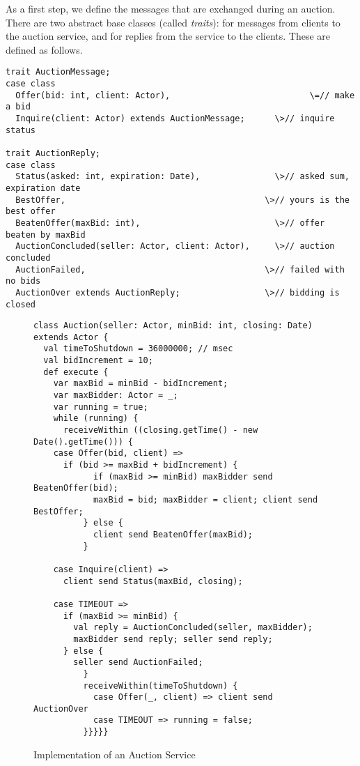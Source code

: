 \documentclass[11pt]{book}
\begin{document}
As a first step, we define the messages that are exchanged during an
auction. There are two abstract base classes (called {\em traits}):
\verb@AuctionMessage@ for messages from clients to the auction
service, and \verb@AuctionReply@ for replies from the service to the
clients.  These are defined as follows.
\begin{verbatim}
trait AuctionMessage;
case class 
  Offer(bid: int, client: Actor),                            \=// make a bid
  Inquire(client: Actor) extends AuctionMessage;      \>// inquire status

trait AuctionReply;
case class
  Status(asked: int, expiration: Date),               \>// asked sum, expiration date
  BestOffer,                                        \>// yours is the best offer
  BeatenOffer(maxBid: int),                           \>// offer beaten by maxBid
  AuctionConcluded(seller: Actor, client: Actor),     \>// auction concluded
  AuctionFailed,                                    \>// failed with no bids
  AuctionOver extends AuctionReply;                 \>// bidding is closed
\end{verbatim}

\begin{figure}[htb]
\begin{verbatim}
class Auction(seller: Actor, minBid: int, closing: Date) extends Actor {
  val timeToShutdown = 36000000; // msec
  val bidIncrement = 10;
  def execute {
    var maxBid = minBid - bidIncrement;
    var maxBidder: Actor = _;
    var running = true;
    while (running) {
      receiveWithin ((closing.getTime() - new Date().getTime())) {
	case Offer(bid, client) =>
	  if (bid >= maxBid + bidIncrement) { 
            if (maxBid >= minBid) maxBidder send BeatenOffer(bid);
            maxBid = bid; maxBidder = client; client send BestOffer;
          } else {
            client send BeatenOffer(maxBid);
          }

	case Inquire(client) =>
	  client send Status(maxBid, closing);

	case TIMEOUT =>
	  if (maxBid >= minBid) {
	    val reply = AuctionConcluded(seller, maxBidder);
	    maxBidder send reply; seller send reply;
	  } else {
	    seller send AuctionFailed;
          }
          receiveWithin(timeToShutdown) {
            case Offer(_, client) => client send AuctionOver
            case TIMEOUT => running = false;
          }}}}}
\end{verbatim}
\caption{\label{fig:simple-auction}Implementation of an Auction Service}
\end{figure}
\end{document}

